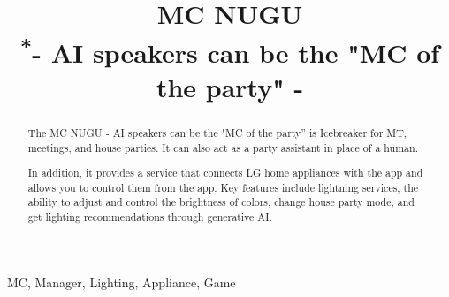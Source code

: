 \documentclass[conference]{IEEEtran}
\begin{document}
\title{MC NUGU\\
{\footnotesize \textsuperscript{*}- AI speakers can be the "MC of the party" -}
}

\author{
\and
{}
\and
{}
}

\maketitle

\begin{abstract}
The MC NUGU - AI speakers can be the "MC of the party” is Icebreaker for MT, meetings, and house parties. It can also act as a party assistant in place of a human.

In addition, it provides a service that connects LG home appliances with the app and allows you to control them from the app. Key features include lightning services, the ability to adjust and control the brightness of colors, change house party mode, and get lighting recommendations through generative AI.

\end{abstract}

\begin{IEEEkeywords}
MC, Manager, Lighting, Appliance, Game
\end{IEEEkeywords}
\end{document}
